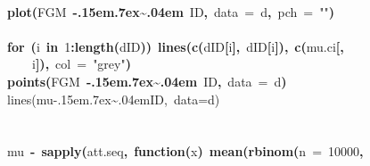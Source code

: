 \documentclass{article}
\makeatletter
\newcommand{\hlnumber}[1]{\textcolor[rgb]{0,0,0}{#1}}%
\newcommand{\hlfunctioncall}[1]{\textcolor[rgb]{.5,0,.33}{\textbf{#1}}}%
\newcommand{\hlstring}[1]{\textcolor[rgb]{.6,.6,1}{#1}}%
\newcommand{\hlkeyword}[1]{\textbf{#1}}%
\newcommand{\hlargument}[1]{\textcolor[rgb]{.69,.25,.02}{#1}}%
\newcommand{\hlcomment}[1]{\textcolor[rgb]{.18,.6,.34}{#1}}%
\newcommand{\hlformalargs}[1]{\hlargument{#1}}%
\newcommand{\hlassignement}[1]{\textbf{#1}}%
\newcommand{\hlsymbol}[1]{#1}%
\def\urltilda{\kern -.15em\lower .7ex\hbox{\~{}}\kern .04em}%
\newcommand{\hlstd}[1]{\textcolor[rgb]{0,0,0}{#1}}%
\newenvironment{kframe}{%
 \def\FrameCommand##1{\hskip\@totalleftmargin \hskip-\fboxsep
 \colorbox{shadecolor}{##1}\hskip-\fboxsep
     \hskip-\linewidth \hskip-\@totalleftmargin \hskip\columnwidth}%
 \MakeFramed {\advance\hsize-\width
   \@totalleftmargin\z@ \linewidth\hsize
   \@setminipage}}%
 {\par\unskip\endMakeFramed}
\newenvironment{knitrout}{}{} %
\makeatother
\begin{document}
\begin{knitrout}
{\begin{kframe}
\begin{flushleft}
\hlstd{}\hspace*{\fill}\\
\hlstd{}\hlfunctioncall{plot}\hlkeyword{(}\hlsymbol{FGM}{\ }\hlkeyword{\urltilda{}}{\ }\hlsymbol{ID}\hlkeyword{,}{\ }\hlargument{data}{\ }\hlargument{=}{\ }\hlsymbol{d}\hlkeyword{,}{\ }\hlargument{pch}{\ }\hlargument{=}{\ }\hlstring{"{}"{}}\hlkeyword{)}\hspace*{\fill}\\
\hlstd{}\hspace*{\fill}\\
\hlstd{}\hlkeyword{for}{\ }\hlkeyword{(}\hlsymbol{i}{\ }\hlkeyword{in}{\ }\hlnumber{1}\hlkeyword{:}\hlfunctioncall{length}\hlkeyword{(}\hlsymbol{d}\hlkeyword{\usebox{\hlnormalsizeboxdollar}}\hlsymbol{ID}\hlkeyword{)}\hlkeyword{)}{\ }\hlfunctioncall{lines}\hlkeyword{(}\hlfunctioncall{c}\hlkeyword{(}\hlsymbol{d}\hlkeyword{\usebox{\hlnormalsizeboxdollar}}\hlsymbol{ID}\hlkeyword{[}\hlsymbol{i}\hlkeyword{]}\hlkeyword{,}{\ }\hlsymbol{d}\hlkeyword{\usebox{\hlnormalsizeboxdollar}}\hlsymbol{ID}\hlkeyword{[}\hlsymbol{i}\hlkeyword{]}\hlkeyword{)}\hlkeyword{,}{\ }\hlfunctioncall{c}\hlkeyword{(}\hlsymbol{mu.ci}\hlkeyword{[}\hlkeyword{,}\hspace*{\fill}\\
\hlstd{}{\ }{\ }{\ }{\ }\hlsymbol{i}\hlkeyword{]}\hlkeyword{)}\hlkeyword{,}{\ }\hlargument{col}{\ }\hlargument{=}{\ }\hlstring{"{}grey"{}}\hlkeyword{)}\hspace*{\fill}\\
\hlstd{}\hlfunctioncall{points}\hlkeyword{(}\hlsymbol{FGM}{\ }\hlkeyword{\urltilda{}}{\ }\hlsymbol{ID}\hlkeyword{,}{\ }\hlargument{data}{\ }\hlargument{=}{\ }\hlsymbol{d}\hlkeyword{)}\hspace*{\fill}\\
\hlstd{}\hlcomment{\usebox{\hlnormalsizeboxhash}lines(mu\urltilda{}ID,{\ }data=d)}\hspace*{\fill}\\
\hlstd{}\hspace*{\fill}\\
\hlstd{}\hspace*{\fill}\\
\hlstd{}\hlsymbol{mu}{\ }\hlassignement{\usebox{\hlnormalsizeboxlessthan}-}{\ }\hlfunctioncall{sapply}\hlkeyword{(}\hlsymbol{att.seq}\hlkeyword{,}{\ }\hlkeyword{function}\hlkeyword{(}\hlformalargs{x}\hlkeyword{)}{\ }\hlfunctioncall{mean}\hlkeyword{(}\hlfunctioncall{rbinom}\hlkeyword{(}\hlargument{n}{\ }\hlargument{=}{\ }\hlnumber{10000}\hlkeyword{,}\hspace*{\fill}\\

\end{flushleft}
\end{kframe}}
\end{knitrout}
\end{document}
